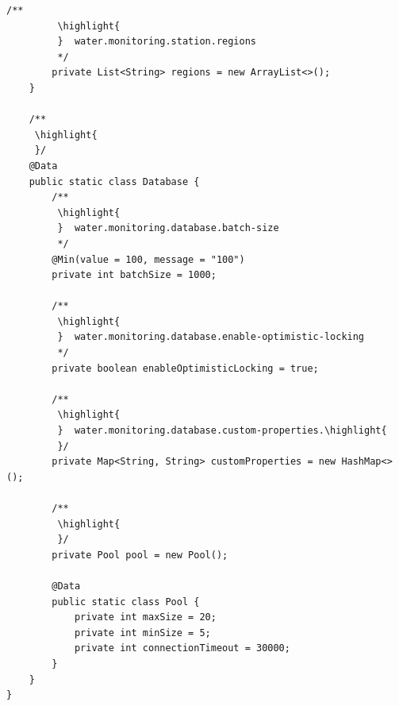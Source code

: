\begin{lstlisting}[style=java]
        /**
         \highlight{ 
         }  water.monitoring.station.regions
         */
        private List<String> regions = new ArrayList<>();
    }
    
    /**
     \highlight{ 
     }/
    @Data
    public static class Database {
        /**
         \highlight{ 
         }  water.monitoring.database.batch-size
         */
        @Min(value = 100, message = "100")
        private int batchSize = 1000;
        
        /**
         \highlight{ 
         }  water.monitoring.database.enable-optimistic-locking
         */
        private boolean enableOptimisticLocking = true;
        
        /**
         \highlight{ 
         }  water.monitoring.database.custom-properties.\highlight{
         }/
        private Map<String, String> customProperties = new HashMap<>();
        
        /**
         \highlight{ 
         }/
        private Pool pool = new Pool();
        
        @Data
        public static class Pool {
            private int maxSize = 20;
            private int minSize = 5;
            private int connectionTimeout = 30000;
        }
    }
}
\end{lstlisting}

\important{}

